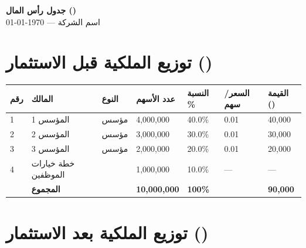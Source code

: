 \documentclass[11pt,a4paper,landscape]{article}
\begin{document}
\begin{center}
{\LARGE\bfseries جدول رأس المال ()}\\[0.3em]
{\large اسم الشركة — \today}\\[1em]
\end{center}

\section{توزيع الملكية قبل الاستثمار ()}
\label{sec:premoney}

\begin{table}[H]
\centering
\small
\renewcommand{\arraystretch}{1.5}
\begin{tabularx}{\textwidth}{C{1cm} L{5cm} C{2.5cm} C{2.5cm} C{2.5cm} C{2.5cm} C{2.5cm}}
\toprule
\textbf{رقم} & \textbf{المالك} & \textbf{النوع} & \textbf{عدد الأسهم} & \textbf{النسبة \%} & \textbf{السعر/سهم} & \textbf{القيمة ()} \\
\midrule
{}
1 & المؤسس 1 & مؤسس & 4,000,000 & 40.0\% & 0.01 & 40,000 \\
2 & المؤسس 2 & مؤسس & 3,000,000 & 30.0\% & 0.01 & 30,000 \\
3 & المؤسس 3 & مؤسس & 2,000,000 & 20.0\% & 0.01 & 20,000 \\
4 & خطة خيارات الموظفين &  & 1,000,000 & 10.0\% & --- & --- \\
\midrule
& \textbf{المجموع} & & \textbf{10,000,000} & \textbf{100\%} & & \textbf{90,000} \\
\bottomrule
\end{tabularx}
\end{table}

\section{توزيع الملكية بعد الاستثمار ()}
\label{sec:postmoney}
\end{document}
